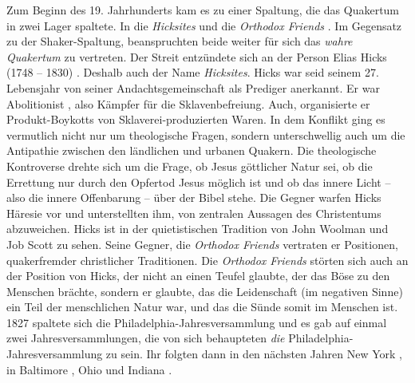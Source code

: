 Zum Beginn des 19. Jahrhunderts kam es zu einer Spaltung, die das Quakertum in
zwei Lager spaltete. In die \textit{Hicksites}  und die
\textit{Orthodox
Friends} . Im Gegensatz zu der Shaker-Spaltung,
beanspruchten beide weiter für
sich das \textit{wahre Quakertum} zu vertreten. Der Streit entzündete sich an
der Person Elias Hicks (1748 -- 1830) . Deshalb
auch der Name \textit{Hicksites}.
Hicks war seid seinem 27. Lebensjahr von seiner Andachtsgemeinschaft als
Prediger
anerkannt. Er war Abolitionist , also Kämpfer
für die Sklavenbefreiung. Auch,
organisierte er Produkt-Boykotts von Sklaverei-produzierten Waren. In dem
Konflikt ging es vermutlich nicht nur um theologische Fragen, sondern
unterschwellig auch um die Antipathie zwischen den ländlichen und urbanen
Quakern. Die theologische Kontroverse drehte sich um die Frage, ob Jesus
göttlicher Natur sei, ob die Errettung nur durch den Opfertod Jesus möglich ist
und ob das innere Licht  -- also die innere Offenbarung --
über der Bibel  stehe.
Die Gegner warfen Hicks Häresie vor und unterstellten ihm, von zentralen
Aussagen des Christentums abzuweichen. Hicks ist in der quietistischen
 Tradition
von John Woolman  und Job Scott
 zu sehen. Seine Gegner, die \textit{Orthodox
Friends}  vertraten er%
 Positionen, quakerfremder christlicher Traditionen. Die
\textit{Orthodox Friends} störten sich auch an der Position von Hicks, der nicht
an einen Teufel  glaubte, der das Böse zu den Menschen
brächte, sondern er
glaubte, das die Leidenschaft (im negativen Sinne) ein Teil der menschlichen
Natur war, und das die Sünde  somit im Menschen ist. 1827 spaltete
sich die
Philadelphia-Jahresversammlung und es gab auf einmal zwei Jahresversammlungen,
die von sich behaupteten \textit{die} Philadelphia-Jahresversammlung zu sein.
Ihr folgten dann in den nächsten Jahren New York , in
Baltimore , Ohio  und
Indiana .

\medskip

